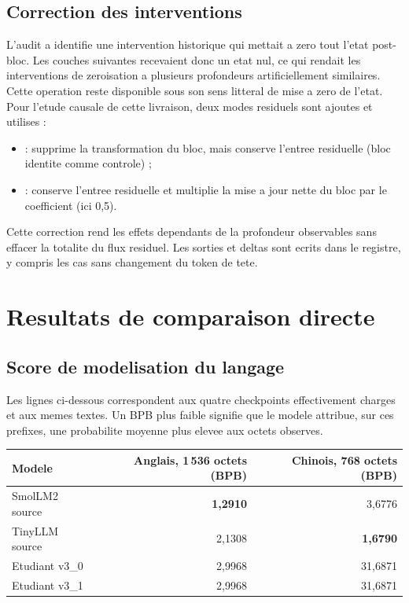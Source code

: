 \documentclass[11pt,a4paper]{article}
\newcommand{\code}[1]{\texttt{\detokenize{#1}}}
\begin{document}
\subsection{Correction des interventions}
L'audit a identifie une intervention historique \code{zero} qui mettait a zero tout l'etat post-bloc. Les couches suivantes recevaient donc un etat nul, ce qui rendait les interventions de zeroisation a plusieurs profondeurs artificiellement similaires. Cette operation reste disponible sous son sens litteral de mise a zero de l'etat. Pour l'etude causale de cette livraison, deux modes residuels sont ajoutes et utilises :
\begin{itemize}
\item \code{zero_update} : supprime la transformation du bloc, mais conserve l'entree residuelle (bloc identite comme controle) ;
\item \code{scale_update} : conserve l'entree residuelle et multiplie la mise a jour nette du bloc par le coefficient (ici 0,5).
\end{itemize}
Cette correction rend les effets dependants de la profondeur observables sans effacer la totalite du flux residuel. Les sorties et deltas sont ecrits dans le registre, y compris les cas sans changement du token de tete.

\section{Resultats de comparaison directe}
\subsection{Score de modelisation du langage}
Les lignes ci-dessous correspondent aux quatre checkpoints effectivement charges et aux memes textes. Un BPB plus faible signifie que le modele attribue, sur ces prefixes, une probabilite moyenne plus elevee aux octets observes.
\begin{center}
\begin{tabular}{lrr}
\toprule
\textbf{Modele} & \textbf{Anglais, 1\,536 octets (BPB)} & \textbf{Chinois, 768 octets (BPB)}\\
\midrule
SmolLM2 source & \textbf{1,2910} & 3,6776\\
TinyLLM source & 2,1308 & \textbf{1,6790}\\
Etudiant v3\_0 & 2,9968 & 31,6871\\
Etudiant v3\_1 & 2,9968 & 31,6871\\
\bottomrule
\end{tabular}
\end{center}
\end{document}
